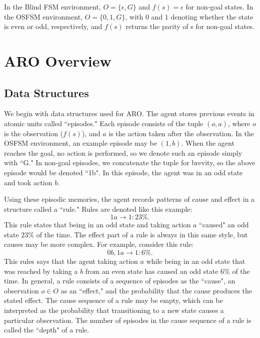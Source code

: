 \documentclass[letterpaper]{article} %
\begin{document}
In the Blind FSM environment, $O = \{\epsilon, G\}$ and $f(s) = \epsilon$ for non-goal states. In the OSFSM environment, $O = \{0, 1, G\}$, with $0$ and $1$ denoting whether the state is even or odd, respectively, and $f(s)$ returns the parity of s for non-goal states.

\section{ARO Overview}


\subsection{Data Structures}

We begin with data structures used for ARO. The agent stores previous events in atomic units called ``episodes." Each episode consists of the tuple $(o, a)$, where $o$ is the observation ($f(s)$), and $a$ is the action taken after the observation. In the OSFSM environment, an example episode may be $(1,b)$. When the agent reaches the goal, no action is performed, so we denote such an episode simply with ``G." In non-goal episodes, we concatenate the tuple for brevity, so the above episode would be denoted ``1b". In this episode, the agent was in an odd state and took action $b$.

Using these episodic memories, the agent records patterns of cause and effect in a structure called a ``rule." Rules are denoted like this example: $$1a \rightarrow 1: 23\%.$$ This rule states that being in an odd state and taking action $a$ ``caused" an odd state $23\%$ of the time. The effect part of a rule is always in this same style, but causes may be more complex. For example, consider this rule: $$0b,1a \rightarrow 1: 6\%.$$ This rules says that the agent taking action $a$ while being in an odd state that was reached by taking a $b$ from an even state has caused an odd state $6\%$ of the time. In general, a rule consists of a sequence of episodes as the ``cause", an observation $o \in O$ as an ``effect," and the probability that the cause produces the stated effect. The cause sequence of a rule may be empty, which can be interpreted as the probability  that transitioning to a new state causes a particular observation. The number of episodes in the cause sequence of a rule is called the ``depth" of a rule.
\end{document}
